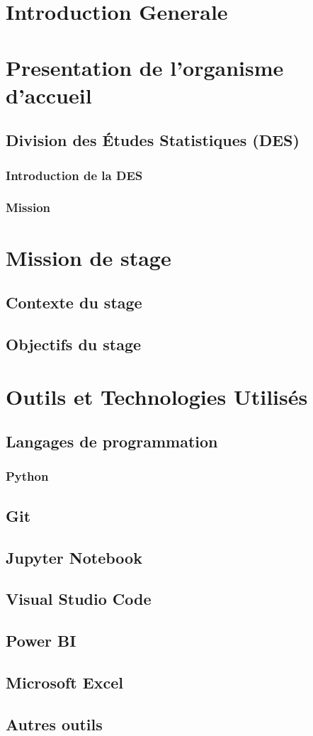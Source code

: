 \section{Introduction Generale} 
\section{Presentation de l'organisme  d'accueil}
\subsection{Division des Études Statistiques (DES)}
\subsubsection{Introduction de la DES}
\subsubsection{Mission}
\section{Mission de stage}
\subsection{Contexte du stage}
\subsection{Objectifs du stage}
\section{Outils et Technologies Utilisés}
\subsection{Langages de programmation}
\subsubsection{Python}
\subsection{Git}
\subsection{Jupyter Notebook}
\subsection{Visual Studio Code}
\subsection{Power BI}
\subsection{Microsoft Excel}
\subsection{Autres outils}
